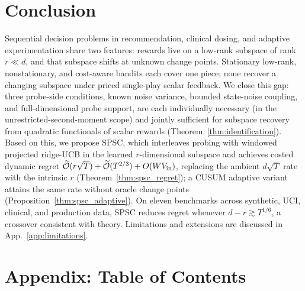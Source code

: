 \documentclass{article}
\newcommand{\tilO}{\widetilde{\mathcal{O}}}
\begin{document}
\section{Conclusion}
\label{sec:conclusion}

Sequential decision problems in recommendation, clinical dosing,
and adaptive experimentation share two features: rewards live on a
low-rank subspace of rank $r\ll d$, and that subspace shifts at
unknown change points. Stationary low-rank, nonstationary, and
cost-aware bandits each cover one piece; none recover a changing
subspace under priced single-play scalar feedback. We close this
gap: three probe-side conditions, known noise variance, bounded
state-noise coupling, and full-dimensional probe support, are each
individually necessary (in the unrestricted-second-moment scope)
and jointly sufficient for subspace recovery from quadratic
functionals of scalar rewards (Theorem~\ref{thm:identification}). Based on this, we propose SPSC,
which interleaves probing with windowed projected ridge-UCB in the
learned $r$-dimensional subspace and achieves costed dynamic regret
$\tilO(r\sqrt T)+\tilO(T^{2/3})+O(WV_{\rm in})$, replacing the
ambient $d\sqrt T$ rate with the intrinsic $r$
(Theorem~\ref{thm:spsc_regret}); a CUSUM adaptive variant attains
the same rate without oracle change points
(Proposition~\ref{thm:spsc_adaptive}). On eleven benchmarks across
synthetic, UCI, clinical, and production data, SPSC reduces regret
whenever $d-r\gtrsim T^{1/6}$, a crossover consistent with theory.
Limitations and extensions are discussed in App.~\ref{app:limitations}.





\clearpage
\appendix

\section*{Appendix: Table of Contents}
\label{app:toc}

\begingroup
\hypersetup{linkcolor=blue}

\newcommand{\tocentry}[3]{%
  \noindent\textbf{#1.}\;\hyperref[#2]{#3}\dotfill\hyperref[#2]{p.\,\pageref*{#2}}\par\vspace{2pt}%
}
\newcommand{\tocsubentry}[3]{%
  \noindent\hspace{1.2em}#1\;\hyperref[#2]{#3}\dotfill\hyperref[#2]{p.\,\pageref*{#2}}\par\vspace{1pt}%
}
\end{document}
